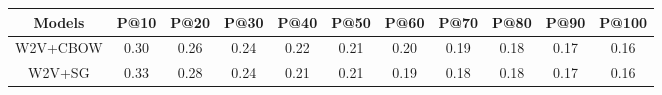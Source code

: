 \begin{tabular}{ccccccccccc}
\toprule
Models & P@10 & P@20 & P@30 & P@40 & P@50 & P@60 & P@70 & P@80 & P@90 & P@100\\
\midrule
W2V+CBOW & 0.30 & 0.26 & 0.24 & 0.22 & 0.21 & 0.20 & 0.19 & 0.18 & 0.17 & 0.16\\
W2V+SG & 0.33 & 0.28 & 0.24 & 0.21 & 0.21 & 0.19 & 0.18 & 0.18 & 0.17 & 0.16\\
\bottomrule
\end{tabular}
